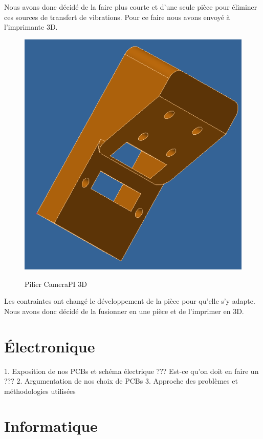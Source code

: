 \documentclass[
	a4paper,									%
	11pt,										%
	twoside,									%
	openright,									%
	notitlepage,									%
	parskip=half,								%
]{scrreprt}										%
\begin{document}
Nous avons donc décidé de la faire plus courte et d'une seule pièce pour éliminer ces sources de transfert de vibrations. 
Pour ce faire nous avons envoyé à l'imprimante 3D. \par

\begin{figure}[!h]
	\centering 
	\includegraphics[scale=.4]{img/SupportCameraPIV2.png}
	\label{SupportCameraPIV2}
	\caption{Pilier CameraPI 3D}	
\end{figure}

Les contraintes ont changé le développement de la pièce pour qu'elle s'y adapte. Nous avons donc décidé de 
la fusionner en une pièce et de l'imprimer en 3D. \par

\chapter{Électronique}





1. Exposition de nos PCBs et schéma électrique ??? Est-ce qu'on doit en faire un ???
2. Argumentation de nos choix de PCBs
3. Approche des problèmes et méthodologies utilisées

\chapter{Informatique}
\end{document}
